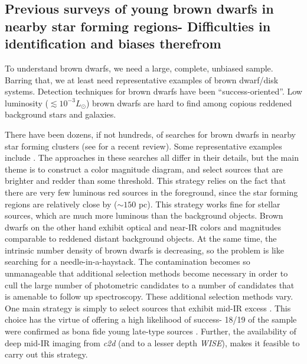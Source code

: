 \subsection{Previous surveys of young brown dwarfs in nearby star forming regions- Difficulties in identification and biases therefrom}

To understand brown dwarfs, we need a large, complete, unbiased sample.  Barring that, we at least need representative examples of brown dwarf/disk systems.  Detection techniques for brown dwarfs have been ``success-oriented''.  Low luminosity ($\lesssim10^{-3}L_{\odot}$) brown dwarfs are hard to find among copious reddened background stars and galaxies.

There have been dozens, if not hundreds, of searches for brown dwarfs in nearby star forming clusters (see \citet{2012ARA&A..50...65L} for a recent review).  Some representative examples include \cite{2004ApJ...602..816L,2012A&A...539A.151A,2014ApJ...785..159M}.  The approaches in these searches all differ in their details, but the main theme is to construct a color magnitude diagram, and select sources that are brighter and redder than some threshold.  This strategy relies on the fact that there are very few luminous red sources in the foreground, since the star forming regions are relatively close by ($\sim150$ pc).  This strategy works fine for stellar sources, which are much more luminous than the background objects.  Brown dwarfs on the other hand exhibit optical and near-IR colors and magnitudes comparable to reddened distant background objects.  At the same time, the intrinsic number density of brown dwarfs is decreasing, so the problem is like searching for a needle-in-a-haystack.  The contamination becomes so unmanageable that additional selection methods become necessary in order to cull the large number of photometric candidates to a number of candidates that is amenable to follow up spectroscopy.  These additional selection methods vary.  One main strategy is simply to select sources that exhibit mid-IR excess \citep{allers06}.  This choice has the virtue of offering a high likelihood of success- 18/19 of the \citet{allers06} sample were confirmed as bona fide young late-type sources \citep{2011ASPC..448..633G}.  Further, the availability of deep mid-IR imaging from \emph{c2d} (and to a lesser depth \emph{WISE}), makes it feasible to carry out this strategy.  

